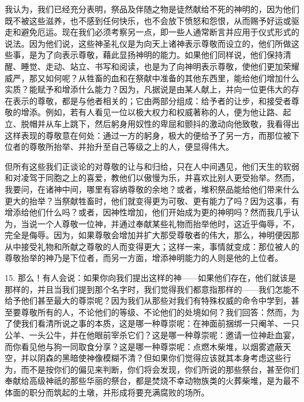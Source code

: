 我认为，我们已经充分表明，祭品及伴随之物是徒然献给不死的神明的，因为他们既不被这些滋养，也不感到任何快乐，也不会放下愤怒和怨恨，从而赐予好运或驱走和避免厄运。现在我们必须考察另一点，即一些人通常断言并应用于仪式形式的说法。因为他们说，这些神圣礼仪是为向天上诸神表示尊敬而设立的，他们所做这些事，是为了向表示尊敬，藉此显扬神明的能力。如果他们同样说，他们保持清醒、睡觉、走动、站立、书写和阅读，也是为了向神明表示尊敬，使他们更加荣耀威严，那又如何呢？从牲畜的血和在祭献中准备的其他东西里，能给他们增加什么实质？能赋予和增添什么能力？因为，凡据说是由某人献上，并向一位更伟大的存在表示的尊敬，都是与他者相关的；它由两部分组成：给予者的让步，和接受者尊敬的增添。例如，若有人看见一位以极大权力和权威著称的人，便为他让路、起立、脱帽并从车上跳下，然后躬身用奴性的卑屈和颤抖的激动向他致敬，我看得出这样表现的尊敬意在何处：通过一方的躬身，极大的便给予了另一方，而那位被下位者的尊敬所抬举、并抬升至自己等级之上的人，便显得伟大。\par

但所有这些我们正谈论的对尊敬的让与和归给，只在人中间遇见，他们天生的软弱和对凌驾于同胞之上的喜爱，教他们以傲慢为乐，并喜欢比别人更受抬举。然而，我要问，在诸神中间，哪里有容纳尊敬的余地？或者，堆积祭品能给他们带来什么更大的抬举？当祭献牲畜时，他们就变得更为可敬、更有能力了吗？因为这事，有增添给他们什么吗？或者，因神性增加，他们开始成为更的神明吗？然而我几乎认为，当说一个人尊敬一位神，并通过奉献某些礼物而抬举他时，这近乎侮辱，不，完全是侮辱。因为，如果尊敬会增加并扩大那受尊敬者的伟大，那么，神明便因那从中接受礼物和所献之尊敬的人而变得更大；这样一来，事情就变成：那位被人的尊敬抬举的神乃是下位者，而另一方面，增添神明能力的人则是他的上位者。\par

15. 那么！有人会说：如果你向我们提出这样的神——如果他们存在，他们就该是那样的，并且当我们提到那个名字时，我们觉得我们都意指那样的——我们怎能不给予他们甚至最大的尊崇呢？因为我们从那些对我们有特殊权威的命令中学到，甚至要尊敬所有的人，不论他们的等级、不论他们的处境如何？我们回答：然而，为了使我们看清所说之事的本质，这是哪一种尊崇呢：在神面前捆绑一只阉羊、一只公羊、一头公牛，并在他眼前宰杀它们？这是哪一种尊崇呢：邀请一位神赴血宴，而你看见他与狗一同取食分享？这是哪一种尊崇呢：点燃木柴堆，以烟雾遮蔽天空，并以阴森的黑暗使神像模糊不清？但如果你们觉得应该就其本身考虑这些行为，而不是按你们的偏见来判断，你们将会发现，你们所说的那些祭台，甚至你们奉献给高级神祇的那些华丽的祭台，都是焚烧不幸动物族类的火葬柴堆，是为最不体面的职分而筑起的土墩，并形成将要充满腐败的场所。\par

